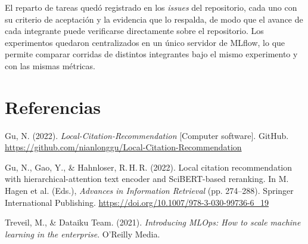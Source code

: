 \documentclass[11pt]{article}
\begin{document}
\vspace{6pt}

El reparto de tareas quedó registrado en los \textit{issues} del repositorio, cada uno con su criterio de aceptación y la evidencia que lo respalda, de modo que el avance de cada integrante puede verificarse directamente sobre el repositorio. Los experimentos quedaron centralizados en un único servidor de MLflow, lo que permite comparar corridas de distintos integrantes bajo el mismo experimento y con las mismas métricas.

\section*{Referencias}

\begin{list}{}{%
  \setlength{\leftmargin}{1.2cm}
  \setlength{\itemindent}{-1.2cm}
  \setlength{\itemsep}{8pt}
  \setlength{\parsep}{0pt}
}

\item Gu, N. (2022). \textit{Local-Citation-Recommendation} [Computer software]. GitHub. \url{https://github.com/nianlonggu/Local-Citation-Recommendation}

\item Gu, N., Gao, Y., \& Hahnloser, R.\,H.\,R. (2022). Local citation recommendation with hierarchical-attention text encoder and SciBERT-based reranking. In M. Hagen et al. (Eds.), \textit{Advances in Information Retrieval} (pp. 274--288). Springer International Publishing. \url{https://doi.org/10.1007/978-3-030-99736-6_19}

\item Treveil, M., \& Dataiku Team. (2021). \textit{Introducing MLOps: How to scale machine learning in the enterprise}. O'Reilly Media.

\end{list}
\end{document}
